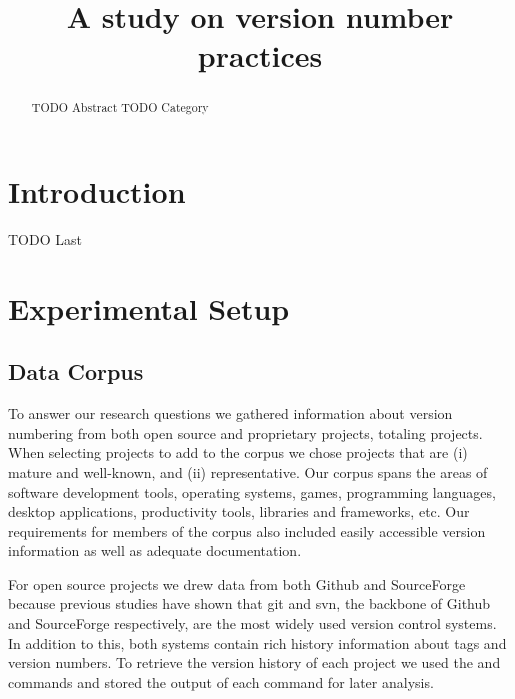 \documentclass[conference]{IEEEtran}
\begin{document}
\title{A study on version number practices}

\author{}


\maketitle
\begin{abstract}
 TODO Abstract
 TODO Category
 \end{abstract}


\IEEEpeerreviewmaketitle

\section{Introduction}
TODO Last



\section{Experimental Setup}

\subsection{Data Corpus}

\par To answer our research questions we gathered information about version numbering from both open source and proprietary projects, totaling  \TotalNumProjects projects. When selecting projects to add to the corpus we chose
projects that are (i) mature and well-known, and (ii) representative. Our corpus spans the areas of software development tools, operating systems, games, programming languages, desktop applications, productivity tools, libraries and frameworks, etc. 
Our requirements for members of the corpus also included easily accessible version information as well as adequate documentation.

For open source projects we drew data from both Github and SourceForge because previous studies \cite{} have shown that git and svn, the backbone of Github and SourceForge respectively, are the most widely used version control systems. In addition to this, both systems contain rich history information about tags and version numbers. To retrieve the version history of each project we used the  and  
commands and stored the output of each command for later analysis.
\end{document}
